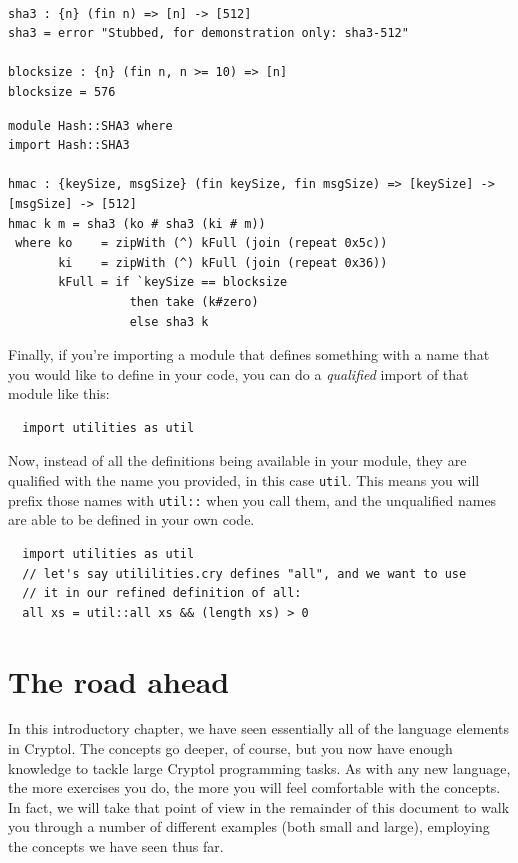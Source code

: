 \begin{verbatim}

sha3 : {n} (fin n) => [n] -> [512]
sha3 = error "Stubbed, for demonstration only: sha3-512"

blocksize : {n} (fin n, n >= 10) => [n]
blocksize = 576
\end{verbatim}

\begin{verbatim}
module Hash::SHA3 where
import Hash::SHA3

hmac : {keySize, msgSize} (fin keySize, fin msgSize) => [keySize] -> [msgSize] -> [512]
hmac k m = sha3 (ko # sha3 (ki # m))
 where ko    = zipWith (^) kFull (join (repeat 0x5c))
       ki    = zipWith (^) kFull (join (repeat 0x36))
       kFull = if `keySize == blocksize
                 then take (k#zero)
                 else sha3 k
\end{verbatim}

Finally, if you're importing a module that defines something with
a name that you would like to define in your code, you can do a
{\it qualified} import of that module like this:

\begin{verbatim}
  import utilities as util
\end{verbatim}

Now, instead of all the definitions being available in your module,
they are qualified with the name you provided, in this case \verb+util+.
This means you will prefix those names with \verb+util::+ when you call them,
and the unqualified names are able to be defined in your own code.

\begin{verbatim}
  import utilities as util
  // let's say utililities.cry defines "all", and we want to use
  // it in our refined definition of all:
  all xs = util::all xs && (length xs) > 0
\end{verbatim}

\section{The road ahead}
\label{sec:road-ahead}

In this introductory chapter, we have seen essentially all of the
language elements in Cryptol. The concepts go deeper, of course, but
you now have enough knowledge to tackle large Cryptol programming
tasks. As with any new language, the more exercises you do, the more
you will feel comfortable with the concepts. In fact, we will take
that point of view in the remainder of this document to walk you
through a number of different examples (both small and large),
employing the concepts we have seen thus far.

